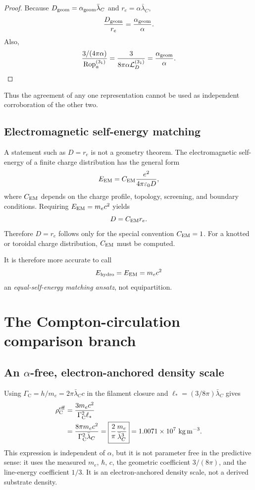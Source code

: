 \documentclass[aps,pre,preprint,notitlepage,nofootinbib,superscriptaddress]{revtex4-2}
\newcommand{\lC}{\bar\lambda_C}
\newcommand{\re}{r_e}
\newcommand{\Rop}{\operatorname{Rop}}
\newcommand{\calL}{\mathcal L}
\newcommand{\rhoCeff}{\rho_{\mathrm C}^{\mathrm{eff}}}
\newcommand{\GammaC}{\Gamma_{\mathrm C}}
\begin{document}
\begin{proof}
Because \(D_{\rm geom}=\alpha_{\rm geom}\lC\) and
\(\re=\alpha\lC\),
\[
\frac{D_{\rm geom}}{\re}
=
\frac{\alpha_{\rm geom}}{\alpha}.
\]
Also,
\[
\frac{3/(4\pi\alpha)}{\Rop_a^{(3_1)}}
=
\frac{3}{8\pi\alpha\calL_D^{(3_1)}}
=
\frac{\alpha_{\rm geom}}{\alpha}.
\]
\end{proof}

Thus the agreement of any one representation cannot be used as independent corroboration of the other two.

\subsection{Electromagnetic self-energy matching}

A statement such as \(D=\re\) is not a geometry theorem.  The electromagnetic self-energy of a finite charge distribution has the general form
\begin{equation}
  E_{\rm EM}
  =
  C_{\rm EM}
  \frac{e^2}{4\pi\varepsilon_0D},
  \label{eq:EM-shape}
\end{equation}
where \(C_{\rm EM}\) depends on the charge profile, topology, screening, and boundary conditions.  Requiring \(E_{\rm EM}=m_ec^2\) yields
\begin{equation}
  D=C_{\rm EM}\re.
  \label{eq:shape-match}
\end{equation}
Therefore \(D=\re\) follows only for the special convention \(C_{\rm EM}=1\).  For a knotted or toroidal charge distribution, \(C_{\rm EM}\) must be computed.

It is therefore more accurate to call
\[
E_{\rm hydro}=E_{\rm EM}=m_ec^2
\]
an \emph{equal-self-energy matching ansatz}, not equipartition.

\section{The Compton-circulation comparison branch}
\label{sec:compton-branch}

\subsection{An \texorpdfstring{\(\alpha\)-free}{alpha-free}, electron-anchored density scale}

Using \(\GammaC=h/m_e=2\pi\lC c\) in the filament closure and
\(\ell_*=(3/8\pi)\lC\) gives
\begin{align}
  \rhoCeff
  &=
  \frac{3m_ec^2}{\GammaC^2\ell_*}
  \notag\\
  &=
  \frac{8\pi m_ec^2}{\GammaC^2\lC}
  =
  \boxed{
  \frac{2}{\pi}\frac{m_e}{\lC^3}
  }
  =
  1.0071\times10^7\ \mathrm{kg\,m^{-3}}.
  \label{eq:rhoC}
\end{align}
This expression is independent of \(\alpha\), but it is not parameter free in the predictive sense: it uses the measured \(m_e\), \(\hbar\), \(c\), the geometric coefficient \(3/(8\pi)\), and the line-energy coefficient \(1/3\).  It is an electron-anchored density scale, not a derived substrate density.
\end{document}
